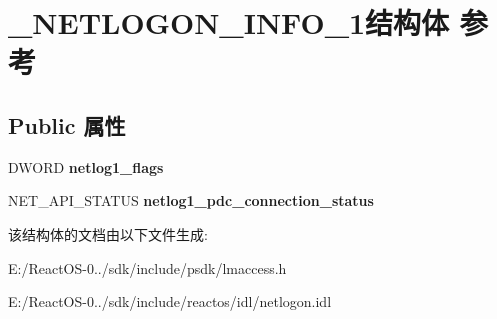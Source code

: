 \hypertarget{struct___n_e_t_l_o_g_o_n___i_n_f_o__1}{}\section{\+\_\+\+N\+E\+T\+L\+O\+G\+O\+N\+\_\+\+I\+N\+F\+O\+\_\+1结构体 参考}
\label{struct___n_e_t_l_o_g_o_n___i_n_f_o__1}
\subsection*{Public 属性}
\begin{DoxyCompactItemize}
\item 
\mbox{\label{struct___n_e_t_l_o_g_o_n___i_n_f_o__1_a648760a32b6ae10db4d9e860962e0409}} 
D\+W\+O\+RD {\bfseries netlog1\+\_\+flags}
\item 
\mbox{\label{struct___n_e_t_l_o_g_o_n___i_n_f_o__1_a32655f565cefe8b97bf7388b2f36633d}} 
N\+E\+T\+\_\+\+A\+P\+I\+\_\+\+S\+T\+A\+T\+US {\bfseries netlog1\+\_\+pdc\+\_\+connection\+\_\+status}
\end{DoxyCompactItemize}


该结构体的文档由以下文件生成\+:\begin{DoxyCompactItemize}
\item 
E\+:/\+React\+O\+S-\/0../sdk/include/psdk/lmaccess.\+h\item 
E\+:/\+React\+O\+S-\/0../sdk/include/reactos/idl/netlogon.\+idl\end{DoxyCompactItemize}
